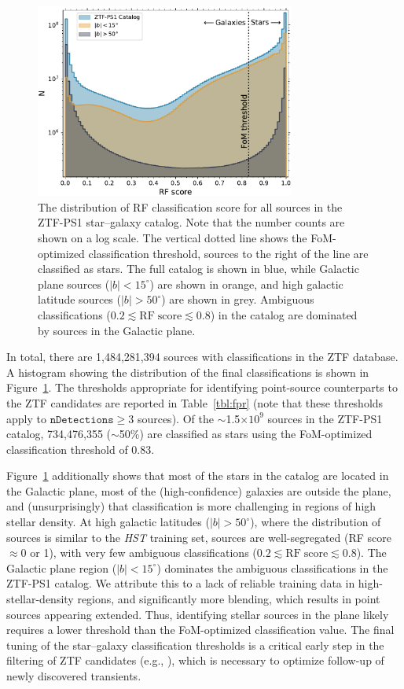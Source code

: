 \documentclass[twocolumn]{aastex62}
\begin{document}
\begin{figure}[htb]
 \centering
  \includegraphics[width=3.35in]{./Figures/ZTF_PS1_cat_hist.pdf}
  \caption{ The distribution of RF classification score for all sources 
 in the ZTF-PS1 star--galaxy
  catalog. Note that the number counts are shown on a log scale. The vertical dotted line shows the FoM-optimized classification threshold, sources to the right of the line are classified as stars. The full catalog is shown in blue, while Galactic plane sources ($|b| <
15^{\circ}$) are shown in orange, and high galactic latitude sources ($|b| > 50^{\circ}$) are shown in grey. Ambiguous classifications ($0.2 \lesssim
\mathrm{RF\;score} \lesssim 0.8$) in the catalog are dominated by sources in the Galactic plane.}
  \label{fig:ztf_hist}
\end{figure}

In total, there are 1,484,281,394 sources with classifications in the ZTF
database. A histogram showing the distribution of the final classifications
is shown in Figure~\ref{fig:ztf_hist}. The thresholds appropriate for
identifying point-source counterparts to the ZTF candidates are reported in
Table~\ref{tbl:fpr} (note that these thresholds apply to
$\mathtt{nDetections} \ge 3$ sources). Of the $\sim$1.5$\times 10^{9}$
sources in the ZTF-PS1 catalog, 734,476,355 ($\sim$50\%) are classified as
stars using the FoM-optimized classification threshold of 0.83.

Figure~\ref{fig:ztf_hist} additionally shows that most of the stars in the
catalog are located in the Galactic plane, most of the (high-confidence)
galaxies are outside the plane, and (unsurprisingly) that classification is
more challenging in regions of high stellar density. At high galactic
latitudes ($|b| > 50^{\circ}$), where the distribution of sources is similar
to the \textit{HST} training set, sources are well-segregated (RF score
$\approx$0 or 1), with very few ambiguous classifications ($0.2 \lesssim
\mathrm{RF\;score} \lesssim 0.8$). The Galactic plane region ($|b| <
15^{\circ}$) dominates the ambiguous classifications in the ZTF-PS1 catalog.
We attribute this to a lack of reliable training data in
high-stellar-density regions, and significantly more blending, which results
in point sources appearing extended. Thus, identifying stellar sources in
the plane likely requires a lower threshold than the FoM-optimized
classification value. The final tuning of the star--galaxy classification
thresholds is a critical early step in the filtering of ZTF candidates
(e.g., \citealt{Kasliwal:18:ZTF}), which is necessary to optimize follow-up of newly
discovered transients.
\end{document}
